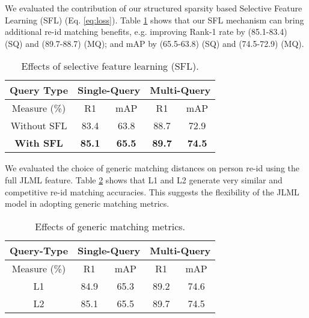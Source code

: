 \documentclass{article}
\begin{document}
\vspace{0.1cm}
We evaluated the contribution of our structured sparsity 
based Selective Feature Learning (SFL)
(Eq. \eqref{eq:loss}).
Table \ref{tab:selective_learn} shows that our SFL mechanism can
bring additional re-id matching benefits, e.g. improving Rank-1 rate
by (85.1-83.4) (SQ) and (89.7-88.7) (MQ); and mAP by
(65.5-63.8) (SQ) and (74.5-72.9) (MQ). 

\begin{table} [!h]
	\centering
	\footnotesize
\renewcommand{\arraystretch}{1}
	\setlength{\tabcolsep}{0.4 cm}
	\vspace{-0.3cm}
	\caption{\footnotesize
		Effects of selective feature learning (SFL).
	}
	\vskip 0pt \begin{tabular}{|c|cc|cc|}
		\hline
Query Type &  \multicolumn{2}{c|}{Single-Query} &\multicolumn{2}{c|}{Multi-Query} \\ \hline
		Measure (\%)    
		& R1 & mAP & R1 & mAP  \\ \hline \hline
		Without SFL &  83.4 &  63.8  &  88.7 &  72.9\\ \hline
		{\bf With SFL} &  \textbf{85.1} &  \textbf{65.5}  &  \textbf{89.7} &  \textbf{74.5}\\ 
		\hline
	\end{tabular}\label{tab:selective_learn}
	\vspace{-0.3cm}
\end{table}



\vspace{0.1cm}
We evaluated the choice of generic matching distances on person re-id
using the full JLML feature.
Table \ref{tab:match_dist} shows that L1 and L2 generate very similar and competitive re-id matching accuracies.
This suggests the flexibility of the JLML model in adopting generic matching metrics.

\begin{table} [!h]
	\centering
	\footnotesize
\renewcommand{\arraystretch}{1}
	\setlength{\tabcolsep}{0.4 cm}
	\vspace{-0.3cm}
	\caption{\footnotesize
		Effects of generic matching metrics.
	}
	\vskip 0pt \begin{tabular}{|c|cc|cc|}
		\hline
Query-Type &  \multicolumn{2}{c|}{Single-Query} &\multicolumn{2}{c|}{Multi-Query} \\ \hline
		Measure (\%)    
		& R1 & mAP & R1 & mAP  \\ \hline \hline
L1 & 84.9 & 65.3 & 89.2 & 74.6 \\ \hline
		L2 &  {85.1} &  {65.5}  &  {89.7} & {74.5}\\ 
		\hline
	\end{tabular}\label{tab:match_dist}
	\vspace{-0.1cm}
\end{table}
\end{document}
